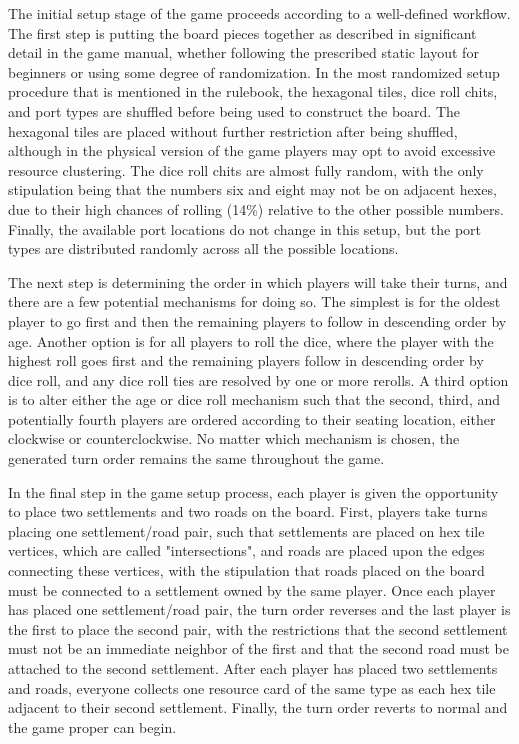 \documentclass[pageno]{jpaper}
\begin{document}
\begin{doublespacing}
The initial setup stage of the game proceeds according to a well-defined workflow. The first step is putting the board pieces together as described in significant detail in the game manual, whether following the prescribed static layout for beginners or using some degree of randomization. In the most randomized setup procedure that is mentioned in the rulebook, the hexagonal tiles, dice roll chits, and port types are shuffled before being used to construct the board. The hexagonal tiles are placed without further restriction after being shuffled, although in the physical version of the game players may opt to avoid excessive resource clustering. The dice roll chits are almost fully random, with the only stipulation being that the numbers six and eight may not be on adjacent hexes, due to their high chances of rolling (14\%) relative to the other possible numbers. Finally, the available port locations do not change in this setup, but the port types are distributed randomly across all the possible locations.

The next step is determining the order in which players will take their turns, and there are a few potential mechanisms for doing so. The simplest is for the oldest player to go first and then the remaining players to follow in descending order by age. Another option is for all players to roll the dice, where the player with the highest roll goes first and the remaining players follow in descending order by dice roll, and any dice roll ties are resolved by one or more rerolls. A third option is to alter either the age or dice roll mechanism such that the second, third, and potentially fourth players are ordered according to their seating location, either clockwise or counterclockwise. No matter which mechanism is chosen, the generated turn order remains the same throughout the game.

In the final step in the game setup process, each player is given the opportunity to place two settlements and two roads on the board. First, players take turns placing one settlement/road pair, such that settlements are placed on hex tile vertices, which are called "intersections", and roads are placed upon the edges connecting these vertices, with the stipulation that roads placed on the board must be connected to a settlement owned by the same player. Once each player has placed one settlement/road pair, the turn order reverses and the last player is the first to place the second pair, with the restrictions that the second settlement must not be an immediate neighbor of the first and that the second road must be attached to the second settlement. After each player has placed two settlements and roads, everyone collects one resource card of the same type as each hex tile adjacent to their second settlement. Finally, the turn order reverts to normal and the game proper can begin.


\end{doublespacing}
\end{document}
